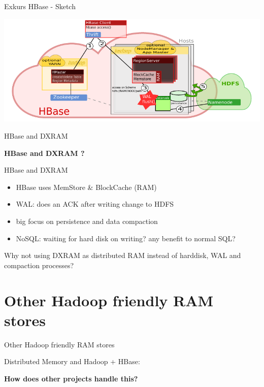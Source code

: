 \begin{frame}{Exkurs HBase - Sketch}
\protect\hypertarget{exkurs-hbase---sketch}{}

\includegraphics{fig/hbase.pdf}

\end{frame}

\begin{frame}{HBase and DXRAM}
\protect\hypertarget{hbase-and-dxram}{}

\textbf{HBase and DXRAM ?}

\end{frame}

\begin{frame}{HBase and DXRAM}
\protect\hypertarget{hbase-and-dxram-1}{}

\begin{itemize}
\tightlist
\item
  HBase uses MemStore \& BlockCache (RAM)
\item
  WAL: does an ACK after writing change to HDFS
\item
  big focus on persistence and data compaction
\item
  NoSQL: waiting for hard disk on writing? any benefit to normal SQL?
\end{itemize}

Why not using DXRAM as distributed RAM instead of harddisk, WAL and
compaction processes?

\end{frame}

\hypertarget{other-hadoop-friendly-ram-stores}{%
\section{Other Hadoop friendly RAM
stores}\label{other-hadoop-friendly-ram-stores}}

\begin{frame}{Other Hadoop friendly RAM stores}
\protect\hypertarget{other-hadoop-friendly-ram-stores-1}{}

Distributed Memory and Hadoop + HBase:

\textbf{How does other projects handle this?}

\end{frame}

